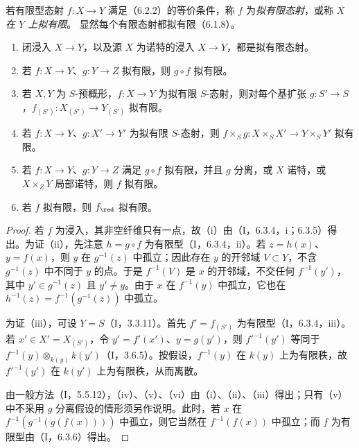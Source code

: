 若有限型态射 $f:X\to Y$ 满足（6.2.2）的等价条件，称 $f$ 为\emph{拟有限态射}，或称 $X$ \emph{在 $Y$ 上拟有限}。
显然每个有限态射都拟有限（6.1.8）。

\begin{enumerate}[label=\textup{(\roman*)}]
\item 闭浸入 $X\to Y$，以及源 $X$ 为诺特的浸入 $X\to Y$，都是拟有限态射。
\item 若 $f:X\to Y$、$g:Y\to Z$ 拟有限，则 $g\circ f$ 拟有限。
\item 若 $X,Y$ 为 $S$-预概形，$f:X\to Y$ 为拟有限 $S$-态射，则对每个基扩张 $g:S'\to S$，$f_{(S')}:X_{(S')}\to Y_{(S')}$ 拟有限。
\item 若 $f:X\to Y$、$g:X'\to Y'$ 为拟有限 $S$-态射，则
$f\times_Sg:X\times_S X'\to Y\times_S Y'$ 拟有限。
\item 若 $f:X\to Y$、$g:Y\to Z$ 满足 $g\circ f$ 拟有限，并且 $g$ 分离，或 $X$ 诺特，或 $X\times_ZY$ 局部诺特，则 $f$ 拟有限。
\item 若 $f$ 拟有限，则 $f_{\red}$ 拟有限。
\end{enumerate}
\begin{proof}
若 $f$ 为浸入，其非空纤维只有一点，故（i）由（I，6.3.4，i；6.3.5）得出。为证（ii），先注意 $h=g\circ f$ 为有限型（I，6.3.4，ii）。若 $z=h(x)$、$y=f(x)$，则 $y$ 在 $g^{-1}(z)$ 中孤立；因此存在 $y$ 的开邻域 $V\subset Y$，不含 $g^{-1}(z)$ 中不同于 $y$ 的点。于是 $f^{-1}(V)$ 是 $x$ 的开邻域，不交任何 $f^{-1}(y')$，其中 $y'\in g^{-1}(z)$ 且 $y'\ne y$。由于 $x$ 在 $f^{-1}(y)$ 中孤立，它也在 $h^{-1}(z)=f^{-1}(g^{-1}(z))$ 中孤立。

为证（iii），可设 $Y=S$（I，3.3.11）。首先 $f'=f_{(S')}$ 为有限型（I，6.3.4，iii）。若 $x'\in X'=X_{(S')}$，令 $y'=f'(x')$、$y=g(y')$，则
$f'^{-1}(y')$ 等同于 $f^{-1}(y)\otimes_{k(y)}k(y')$（I，3.6.5）。按假设，$f^{-1}(y)$ 在 $k(y)$ 上为有限秩，故 $f'^{-1}(y')$ 在 $k(y')$ 上为有限秩，从而离散。

由一般方法（I，5.5.12），（iv）、（v）、（vi）由（i）、（ii）、（iii）得出；只有（v）中不采用 $g$ 分离假设的情形须另作说明。此时，若 $x$ 在
$f^{-1}(g^{-1}(g(f(x))))$ 中孤立，则它当然在 $f^{-1}(f(x))$ 中孤立；而 $f$ 为有限型由（I，6.3.6）得出。
\end{proof}

